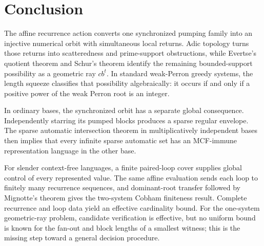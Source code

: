 \section{Conclusion}\label{sec:conclusion}

The affine recurrence action converts one synchronized pumping family into
an injective numerical orbit with simultaneous local returns. Adic topology
turns those returns into scatteredness and prime-support obstructions, while
Evertse's quotient theorem and Schur's theorem identify the remaining
bounded-support possibility as a geometric ray \(cb^t\). In standard
weak-Perron greedy systems, the length squeeze classifies that possibility
algebraically: it occurs if and only if a positive power of the weak Perron
root is an integer.

In ordinary bases, the synchronized orbit has a separate global consequence.
Independently starring its pumped blocks produces a sparse regular envelope.
The sparse automatic intersection theorem in multiplicatively independent
bases then implies that every infinite sparse automatic set has an MCF-immune
representation language in the other base.

For slender context-free languages, a finite paired-loop cover supplies
global control of every represented value. The same affine evaluation sends
each loop to finitely many recurrence sequences, and dominant-root transfer
followed by Mignotte's theorem gives the two-system Cobham finiteness result.
Complete recurrence and loop data yield an effective cardinality bound. For
the one-system geometric-ray problem, candidate verification is effective,
but no uniform bound is known for the fan-out and block lengths of a smallest
witness; this is the missing step toward a general decision procedure.
